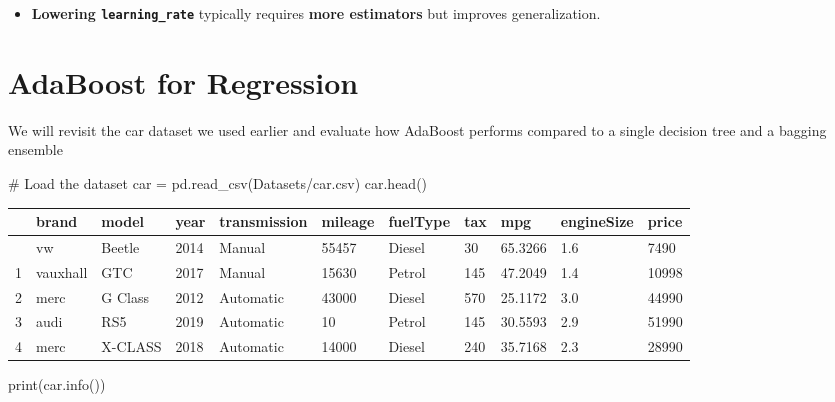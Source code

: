 \documentclass[
  letterpaper,
  DIV=11,
  numbers=noendperiod]{scrreprt}
\newenvironment{Shaded}{\begin{snugshade}}{\end{snugshade}}
\newcommand{\BuiltInTok}[1]{\textcolor[rgb]{0.00,0.23,0.31}{#1}}
\newcommand{\CommentTok}[1]{\textcolor[rgb]{0.37,0.37,0.37}{#1}}
\newcommand{\NormalTok}[1]{\textcolor[rgb]{0.00,0.23,0.31}{#1}}
\newcommand{\OperatorTok}[1]{\textcolor[rgb]{0.37,0.37,0.37}{#1}}
\newcommand{\StringTok}[1]{\textcolor[rgb]{0.13,0.47,0.30}{#1}}
\providecommand{\tightlist}{%
  \setlength{\itemsep}{0pt}\setlength{\parskip}{0pt}}\usepackage{longtable,booktabs,array}
\begin{document}
\begin{itemize}
\tightlist
\item
  \textbf{Lowering \texttt{learning\_rate}} typically requires
  \textbf{more estimators} but improves generalization.
\end{itemize}

\section{AdaBoost for Regression}\label{adaboost-for-regression}

We will revisit the car dataset we used earlier and evaluate how
AdaBoost performs compared to a single decision tree and a bagging
ensemble

\begin{Shaded}
\begin{Highlighting}[]
\CommentTok{\# Load the dataset}
\NormalTok{car }\OperatorTok{=}\NormalTok{ pd.read\_csv(}\StringTok{\textquotesingle{}Datasets/car.csv\textquotesingle{}}\NormalTok{)}
\NormalTok{car.head()}
\end{Highlighting}
\end{Shaded}

\begin{longtable}[]{@{}lllllllllll@{}}
\toprule\noalign{}
& brand & model & year & transmission & mileage & fuelType & tax & mpg &
engineSize & price \\
\midrule\noalign{}
\endhead
\bottomrule\noalign{}
\endlastfoot
0 & vw & Beetle & 2014 & Manual & 55457 & Diesel & 30 & 65.3266 & 1.6 &
7490 \\
1 & vauxhall & GTC & 2017 & Manual & 15630 & Petrol & 145 & 47.2049 &
1.4 & 10998 \\
2 & merc & G Class & 2012 & Automatic & 43000 & Diesel & 570 & 25.1172 &
3.0 & 44990 \\
3 & audi & RS5 & 2019 & Automatic & 10 & Petrol & 145 & 30.5593 & 2.9 &
51990 \\
4 & merc & X-CLASS & 2018 & Automatic & 14000 & Diesel & 240 & 35.7168 &
2.3 & 28990 \\
\end{longtable}

\begin{Shaded}
\begin{Highlighting}[]
\BuiltInTok{print}\NormalTok{(car.info())}
\end{Highlighting}
\end{Shaded}
\end{document}
